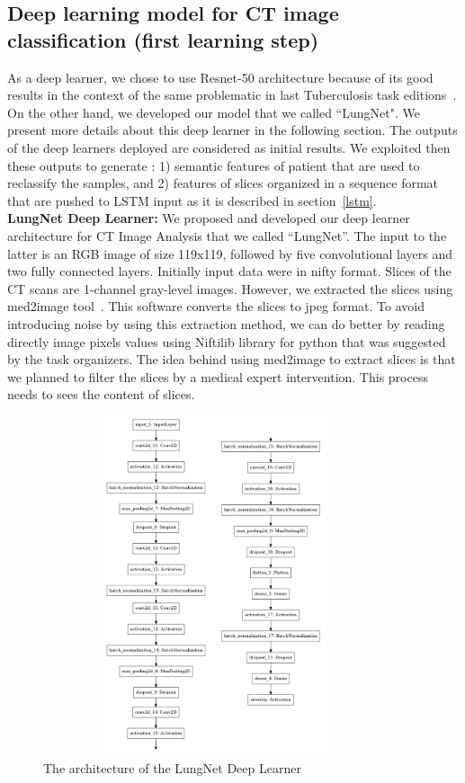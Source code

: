 \documentclass{llncs}
\begin{document}
\subsection{Deep learning model for CT image classification (first learning step)}
As a deep learner, we chose to use Resnet-50 architecture because of its good results in the context of the same problematic in last Tuberculosis task editions~\cite{sgeast17}. On the other hand, we developed our model that we called ``LungNet". We present more details about this deep  learner in the following section. The outputs of the deep learners deployed are considered as initial results. We exploited then these outputs to generate : 1) semantic features of patient that are used to reclassify the samples, and 2) features of slices organized in a sequence format that are pushed to LSTM input as it is described in section~\ref{lstm}.\\

\textbf{LungNet Deep Learner:}
We proposed and developed our deep learner architecture for CT Image Analysis that we called ``LungNet''. The input to the latter is an RGB image of size 119x119, followed by five convolutional layers and two fully connected layers. Initially input data were in nifty format. Slices of the CT scans are 1-channel gray-level images. However,  we extracted the slices using med2image tool~\cite{med2image}. This software converts the slices to jpeg format. To avoid introducing noise by using this extraction method, we can do better by reading directly image pixels values using Niftilib library for python that was suggested by the task organizers. The idea behind using med2image to extract slices is that we planned to filter the slices by a medical expert intervention. This process needs to sees the content of slices. 


\begin{figure}
\center
\includegraphics[width=10cm,height=10cm]{lungnet3.pdf}
\caption{The architecture of the LungNet Deep Learner} 
\label{fig:lungnet}
\end{figure}
\end{document}
